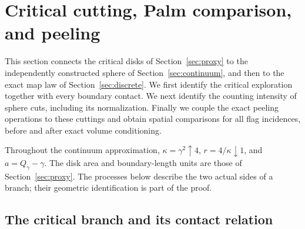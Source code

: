 \section{Critical cutting, Palm comparison, and peeling}\label{sec:cutting}

This section connects the critical disks of Section~\ref{sec:proxy} to the
independently constructed sphere of Section~\ref{sec:continuum}, and then to the
exact map law of Section~\ref{sec:discrete}.  We first identify the critical
exploration together with every boundary contact.  We next identify the
counting intensity of sphere cuts, including its normalization.  Finally we
couple the exact peeling operations to these cuttings and obtain spatial
comparisons for all flag incidences, before and after exact volume conditioning.

Throughout the continuum approximation,
\(\kappa=\gamma^2\uparrow4\), \(r=4/\kappa\downarrow1\), and
\(a=Q_\gamma-\gamma\).  The disk area and boundary-length units are those of
Section~\ref{sec:proxy}.  The processes below describe the two actual sides of
a branch; their geometric identification is part of the proof.

\subsection{The critical branch and its contact relation}\label{cut:branch}

